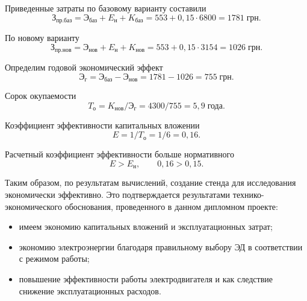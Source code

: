        Приведенные затраты по базовому варианту составили
        \begin{equation*}
            \text{З}_\text{пр.баз} = 
                \text{Э}_\text{баз} + E_\text{н} + K_\text{баз} = 
                    553 + 0,15 \cdot 6800 = 1781 \; \text{грн}.
        \end{equation*}

        По новому варианту
        \begin{equation*}
            \text{З}_\text{пр.нов} = 
                \text{Э}_\text{нов} + E_\text{н} + K_\text{нов} = 
                    553 + 0,15 \cdot 3154 = 1026 \; \text{грн}.
        \end{equation*}

        Определим годовой экономический эффект
        \begin{equation*}
            \text{Э}_\text{г} = \text{Э}_\text{баз} 
                - \text{Э}_\text{нов} = 1781 - 1026 = 755 \; \text{грн}.
        \end{equation*}

        Сорок окупаемости
        \begin{equation*}
            T_\text{о} = K_\text{нов} / \text{Э}_\text{г} = 
                4300 / 755 = 5,9 \; \text{года}.
        \end{equation*}

        Коэффициент эффективности капитальных вложении
        \begin{equation*}
            E = 1 / T_\text{о} = 1 / 6 = 0,16.
        \end{equation*}

       Расчетный коэффициент эффективности больше нормативного 
        \begin{equation*}
            E > E_\text{н},\qquad 0,16 > 0,15. 
        \end{equation*}

        Таким образом, по результатам вычислений, создание стенда для
        исследования экономически эффективно. Это подтверждается результатами
        технико-экономического обоснования, проведенного в данном дипломном
        проекте:
        \begin{itemize}
            \item имеем экономию капитальных вложений и эксплуатационных
                затрат;
            \item экономию электроэнергии благодаря правильному выбору ЭД в
                соответствии с режимом работы;
            \item повышение эффективности работы электродвигателя и как
                следствие снижение эксплуатационных расходов.
        \end{itemize}
